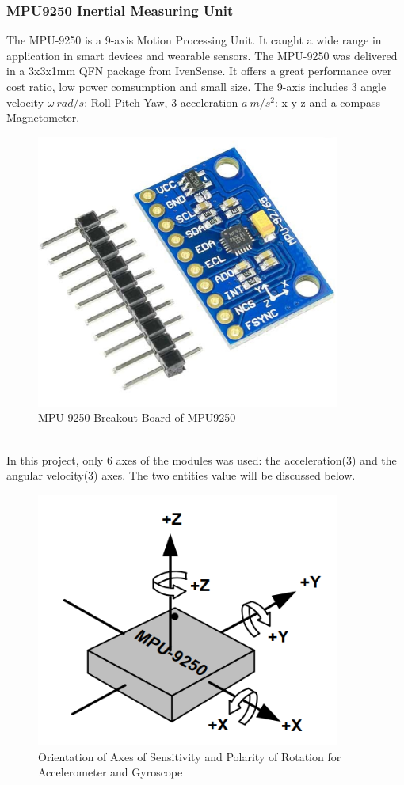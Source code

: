 \documentclass[12 pt, a4paper]{thesis}
\begin{document}
\subsubsection{MPU9250 Inertial Measuring Unit}
The MPU-9250 is a 9-axis Motion Processing Unit. It caught a wide range in application in smart devices and wearable sensors. The MPU-9250 was delivered in a 3x3x1mm QFN package from IvenSense. It offers a great performance over cost ratio, low power comsumption and small size. The 9-axis includes 3 angle velocity $\omega\: rad/s$: Roll Pitch Yaw, 3 acceleration $a\: m/s^2$: x y z and a compass-Magnetometer.\\
\begin{figure}
\centering
\includegraphics[width = 100mm]{MPU9250.png}
\caption{MPU-9250 Breakout Board of MPU9250}
\end{figure}
\\In this project, only 6 axes of the modules was used: the acceleration(3) and the angular velocity(3) axes. The two entities value will be discussed below.\\
\begin{figure}
\centering
\includegraphics[width=100mm]{RPY.png}
\caption{Orientation of Axes of Sensitivity and Polarity of Rotation for Accelerometer and Gyroscope}
\end{figure}
\end{document}
